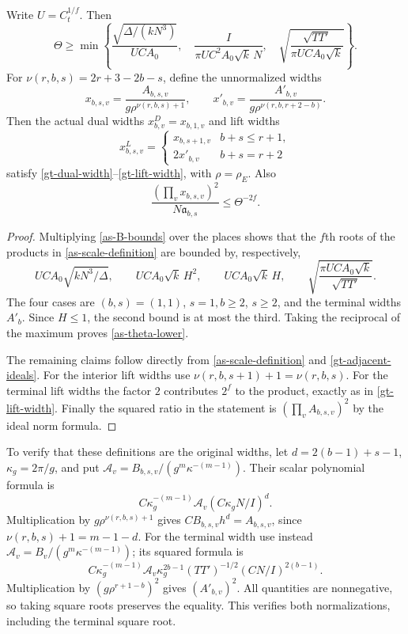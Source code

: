 \begin{proposition}\label{as-widths}
Write $U=C_t^{1/f}$.  Then
\begin{equation}\label{as-theta-lower}
 \Theta\geq\min\left\{
 \frac{\sqrt{\Delta/(kN^3)}}{UCA_0},\quad
 \frac{I}{\pi UC^2A_0\sqrt k\,N},\quad
 \sqrt{\frac{\sqrt{TT'}}{\pi UCA_0\sqrt k}}
                            \right\}.
\end{equation}
For $\nu(r,b,s)=2r+3-2b-s$, define the unnormalized widths
\[
 x_{b,s,v}=\frac{A_{b,s,v}}{g\rho^{\nu(r,b,s)+1}},
 \qquad
 x'_{b,v}=\frac{A'_{b,v}}{g\rho^{\nu(r,b,r+2-b)}}.
\]
Then the actual dual widths $x^D_{b,v}=x_{b,1,v}$ and lift widths
\begin{equation}\label{as-actual-lift-widths}
 x^L_{b,s,v}=
 \begin{cases}
 x_{b,s+1,v}&b+s\leq r+1,\\
 2x'_{b,v}&b+s=r+2
 \end{cases}
\end{equation}
satisfy \eqref{gt-dual-width}--\eqref{gt-lift-width}, with
$\rho=\rho_E$.  Also
\[
 \frac{(\prod_vx_{b,s,v})^2}{N\mathfrak a_{b,s}}
                                          \leq\Theta^{-2f}.
\]
\end{proposition}

\begin{proof}
Multiplying \eqref{as-B-bounds} over the places shows that
the $f$th roots of the products in
\eqref{as-scale-definition} are bounded by, respectively,
\[
 UCA_0\sqrt{kN^3/\Delta},\qquad
 UCA_0\sqrt k\,H^2,\qquad
 UCA_0\sqrt k\,H,\qquad
 \sqrt{\frac{\pi UCA_0\sqrt k}{\sqrt{TT'}}}.
\]
The four cases are $(b,s)=(1,1)$, $s=1,b\geq2$,
$s\geq2$, and the terminal widths $A'_b$.
Since $H\leq1$, the second bound is at most the third.
Taking the reciprocal of the maximum proves
\eqref{as-theta-lower}.

The remaining claims follow directly from
\eqref{as-scale-definition} and
\eqref{gt-adjacent-ideals}.  For the interior lift widths use
$\nu(r,b,s+1)+1=\nu(r,b,s)$.
For the terminal lift widths the factor $2$ contributes $2^f$
to the product, exactly as in \eqref{gt-lift-width}.
Finally the squared ratio in the statement is
$(\prod_vA_{b,s,v})^2$ by the ideal norm formula.
\end{proof}

To verify that these definitions are the original widths,
let $d=2(b-1)+s-1$, $\kappa_g=2\pi/g$, and put
$\mathcal A_v=B_{b,s,v}/(g^m\kappa^{-(m-1)})$.
Their scalar polynomial formula is
\[
 C\kappa_g^{-(m-1)}\mathcal A_v
               (C\kappa_gN/I)^d.
\]
Multiplication by $g\rho^{\nu(r,b,s)+1}$ gives
$CB_{b,s,v}h^d=A_{b,s,v}$, since
$\nu(r,b,s)+1=m-1-d$.
For the terminal width use instead
$\mathcal A_v=B_v/(g^m\kappa^{-(m-1)})$; its squared formula is
\[
 C\kappa_g^{-(m-1)}\mathcal A_v
       \kappa_g^{2b-1}(TT')^{-1/2}(CN/I)^{2(b-1)}.
\]
Multiplication by $(g\rho^{r+1-b})^2$ gives
$(A'_{b,v})^2$.  All quantities are nonnegative, so taking
square roots preserves the equality.  This verifies both
normalizations, including the terminal square root.

